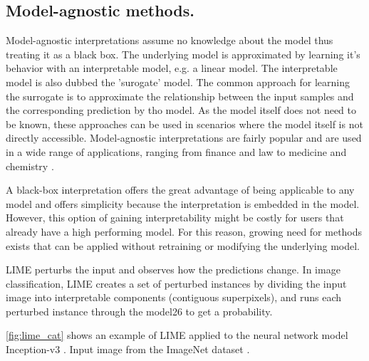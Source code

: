 \subsection{Model-agnostic methods.}
\label{subsec:bb_methods}

Model-agnostic interpretations assume no knowledge about the model thus treating it as a black box. The underlying model is approximated by learning it's behavior with an interpretable model, e.g. a linear model. The interpretable model is also dubbed the 'surogate' model. The common approach for learning the surrogate is to approximate the relationship between the input samples and the corresponding prediction by tho model.
As the model itself does not need to be known, these approaches can be used in scenarios where the model itself is not directly accessible. Model-agnostic interpretations are fairly popular and are used in a wide range of applications, ranging from finance and law to medicine and chemistry \cite{elshawi2019interpretability, whitmore2016mapping}. 

A black-box interpretation offers the great advantage of being applicable to any model and offers simplicity because the interpretation is embedded in the model. However, this option of gaining interpretability might be costly for users that already have a high performing model. For this reason, growing need for methods exists that can be applied without retraining or modifying the underlying model.



LIME \cite{ribeiro2016should} perturbs the input and observes how the predictions change. In image classification,  LIME creates a set of perturbed instances by dividing the input image into interpretable components (contiguous superpixels), and runs each perturbed instance through the model26
to get a probability.

\autoref{fig:lime_cat} shows an example of LIME applied to the neural network model Inception-v3 \cite{szegedy2016rethinking}. Input image from the ImageNet dataset \cite{ILSVRC15}.

